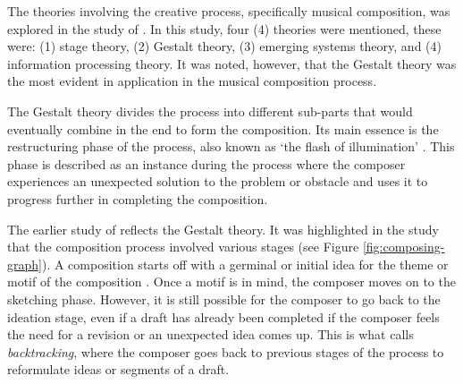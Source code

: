        The theories involving the creative process, specifically musical composition, was explored in the study of \citet{collins2005synthesis}. In this study, four (4) theories were mentioned, these were: (1) stage theory, (2) Gestalt theory, (3) emerging systems theory, and (4) information processing theory. It was noted, however, that the Gestalt theory was the most evident in application in the musical composition process.
       
       The Gestalt theory divides the process into different sub-parts that would eventually combine in the end to form the composition. Its main essence is the restructuring phase of the process, also known as `the flash of illumination' \citep{collins2005synthesis}. This phase is described as an instance during the process where the composer experiences an unexpected solution to the problem or obstacle and uses it to progress further in completing the composition.
       
        
        \begin{comment}
        \begin{figure}[H]
			\centering
			\texttt{[image: Process\_of\_Composition]}
    		\caption{The stages of music composition. \citep{bennett1976process}} 
    		\label{fig:MUSIC_benettcompositionstages}
		\end{figure}
        \end{comment}
        
        The earlier study of \citet{bennett1976process} reflects the Gestalt theory. It was highlighted in the study that the composition process involved various stages (see Figure \ref{fig:composing-graph}). A composition starts off with a germinal or initial idea for the theme or motif of the composition \citep{bennett1976process,collins2005synthesis}. Once a motif is in mind, the composer moves on to the sketching phase. However, it is still possible for the composer to go back to the ideation stage, even if a draft has already been completed if the composer feels the need for a revision or an unexpected idea comes up. This is what \citet{collins2005synthesis} calls \textit{backtracking}, where the composer goes back to previous stages of the process to reformulate ideas or segments of a draft.
        
